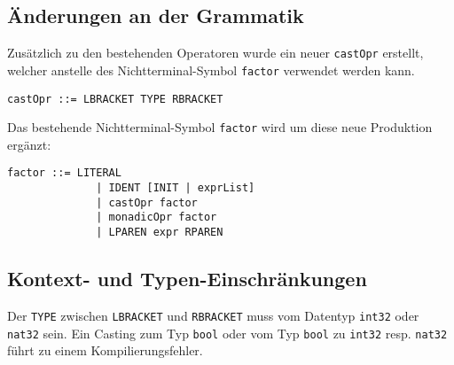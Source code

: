 \documentclass[10pt, a4paper, twocolumn]{article} %
\begin{document}
\subsection{Änderungen an der Grammatik}
Zusätzlich zu den bestehenden Operatoren wurde ein neuer \texttt{castOpr} erstellt, welcher anstelle des Nichtterminal-Symbol \texttt{factor} verwendet werden kann.
\begin{lstlisting}[backgroundcolor = \color{lightgray},
xleftmargin = 0.05cm,
framexleftmargin = 0.05em]
    castOpr ::= LBRACKET TYPE RBRACKET
\end{lstlisting}
Das bestehende Nichtterminal-Symbol \texttt{factor} wird um diese neue Produktion ergänzt:
\begin{lstlisting}[backgroundcolor = \color{lightgray},
xleftmargin = 0.05cm,
framexleftmargin = 0.05em]
    factor ::= LITERAL
              | IDENT [INIT | exprList]
              | castOpr factor
              | monadicOpr factor
              | LPAREN expr RPAREN
\end{lstlisting}

\subsection{Kontext- und Typen-Einschränkungen}
Der \texttt{TYPE} zwischen \texttt{LBRACKET} und \texttt{RBRACKET} muss vom Datentyp \texttt{int32} oder \texttt{nat32} sein.
Ein Casting zum Typ \texttt{bool} oder vom Typ \texttt{bool} zu \texttt{int32} resp. \texttt{nat32} führt zu einem Kompilierungsfehler.
\end{document}
